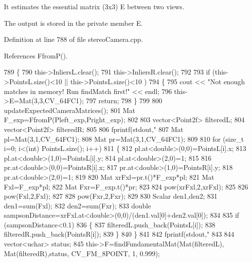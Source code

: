 It estimates the essential matrix (3x3) E between two views. 

The output is stored in the private member E. 

Definition at line 788 of file stereo\+Camera.\+cpp.



References Ffrom\+P().


\begin{DoxyCode}
789 \{
790     this->InliersL.clear();
791     this->InliersR.clear();
792 
793     \textcolor{keywordflow}{if} (this->PointsL.size()<10 || this->PointsL.size()<10 )
794     \{
795         cout << \textcolor{stringliteral}{"Not enough matches in memory! Run findMatch first!"} << endl;
796         this->E=Mat(3,3,CV\_64FC1);
797         \textcolor{keywordflow}{return};
798     \}
799 
800     updateExpectedCameraMatrices();
801     Mat F\_exp=FfromP(Pleft\_exp,Pright\_exp);
802 
803     vector<Point2f> filteredL;
804     vector<Point2f> filteredR;
805 
806     fprintf(stdout,\textcolor{stringliteral}{"%
807     Mat pl=Mat(3,1,CV\_64FC1);
808     Mat pr=Mat(3,1,CV\_64FC1);
809 
810     \textcolor{keywordflow}{for} (\textcolor{keywordtype}{size\_t} i=0; i<(int) PointsL.size(); i++)
811     \{
812         pl.at<\textcolor{keywordtype}{double}>(0,0)=PointsL[i].x;
813         pl.at<\textcolor{keywordtype}{double}>(1,0)=PointsL[i].y;
814         pl.at<\textcolor{keywordtype}{double}>(2,0)=1;
815         
816         pr.at<\textcolor{keywordtype}{double}>(0,0)=PointsR[i].x;
817         pr.at<\textcolor{keywordtype}{double}>(1,0)=PointsR[i].y;
818         pr.at<\textcolor{keywordtype}{double}>(2,0)=1;
819              
820         Mat xrFxl=pr.t()*F\_exp*pl;
821         Mat Fxl=F\_exp*pl;
822         Mat Fxr=F\_exp.t()*pr;
823 
824         pow(xrFxl,2,xrFxl);
825 
826         pow(Fxl,2,Fxl);
827 
828         pow(Fxr,2,Fxr);
829         
830         Scalar den1,den2;
831         den1=sum(Fxl);
832         den2=sum(Fxr);
833         \textcolor{keywordtype}{double} sampsonDistance=xrFxl.at<\textcolor{keywordtype}{double}>(0,0)/(den1.val[0]+den2.val[0]);
834         
835         \textcolor{keywordflow}{if} (sampsonDistance<0.1)
836         \{
837             filteredL.push\_back(PointsL[i]);
838             filteredR.push\_back(PointsR[i]);
839         \}
840     \}
841 
842     fprintf(stdout,\textcolor{stringliteral}{"%
843 
844     vector<uchar> status;
845     this->F=findFundamentalMat(Mat(filteredL), Mat(filteredR),status, CV\_FM\_8POINT, 1, 0.999);
}}
\end{DoxyCode}
